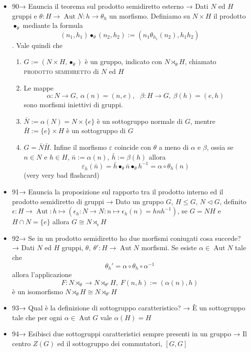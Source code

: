 \documentclass[A4,12pt]{article}
\begin{document}
\begin{itemize}[noitemsep]
		\item 90→ Enuncia il teorema sul prodotto semidiretto esterno → Dati $ N $ ed $ H $ gruppi e $ \theta:H\to \operatorname{Aut}N:h\to \theta_h $ un morfismo. Definiamo su $ N\times H $ il prodotto $ \bullet_\theta $ mediante la formula \[(n_1,h_1)\bullet_\theta (n_2,h_2):=(n_1\theta_{h_1}(n_2),h_1h_2)\]. Vale quindi che \begin{enumerate}
			\item $ G:=(N\times H,\bullet_\theta) $ è un gruppo, indicato con $ N\rtimes_\theta H $, chiamato \textsc{prodotto semidiretto} di $ N $ ed $ H $
			\item Le mappe \[\alpha:N\to G,\ \alpha(n)=(n,e),\ \ \ \beta:H\to G,\ \beta(h)=(e,h)\] sono morfismi iniettivi di gruppi.
			\item $ \bar N:= \alpha(N)=N\times \{e\} $ è un sottogruppo normale di $ G $, mentre $ \bar H:=\{e\}\times H $ è un sottogruppo di $ G $
			\item $ G = \bar N\bar H $. Infine il morfismo $ \varepsilon  $ coincide con $\theta $ a meno di $ \alpha  $ e $ \beta $, ossia se $ n\in N $ e $ h\in H $, $ \bar n:= \alpha(n) $, $ \bar h:= \beta(h) $ allora \[\varepsilon_{\bar h}(\bar n)=\bar h\bullet_\theta \bar n \bullet_\theta h^{-1} = \alpha \circ \theta_h(n)\] (very very bad flashcard)
		\end{enumerate}
		\item 91→ Enuncia la proposizione  sul rapporto tra il prodotto interno ed il prodotto semidiretto di gruppi → Dato un gruppo $ G $, $ H\leq G$, $ N\lhd G$, definito $ \epsilon:H\to \operatorname{Aut}:h\mapsto (\epsilon_h:N\to N:n\mapsto \epsilon_h(n)=hnh^{-1}) $, se $ G = NH $ e $ H\cap N=\{e\} $ allora $ G\cong N\rtimes_\epsilon H $
		\item 92→ Se in un prodotto semidiretto ho due morfismi coniugati cosa succede? → Dati $ N $ ed $ H $ gruppi, $ \theta,\ \theta':H\to \operatorname{Aut} N $ morfismi. Se esiste $ \alpha \in \operatorname{Aut} N $ tale che \[\theta_h' = \alpha\circ \theta_h\circ \alpha^{-1}\] allora l'applicazione \[ F:N\rtimes_\theta \to N\rtimes_{\theta'}H,\ F(n,h):= (\alpha(n),h) \] è un isomorfismo $ N\rtimes_\theta H \cong N\rtimes_{\theta'} H$
		\item 93→ Qual è la definizione di sottogruppo caratteristico? → È un sottogruppo tale che per ogni $ \alpha \in \operatorname{Aut}G $ vale $ \alpha(H) = H $
		\item 94→ Esibisci due sottogruppi caratteristici sempre presenti in un gruppo → Il centro $ Z(G) $ ed il sottogruppo dei commutatori, $ [G,G] $

\end{itemize}
\end{document}
